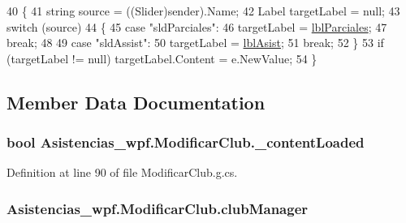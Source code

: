 \begin{DoxyCode}
40         \{
41             \textcolor{keywordtype}{string} source = ((Slider)sender).Name;
42             Label targetLabel = null;
43             \textcolor{keywordflow}{switch} (source)
44             \{
45                 \textcolor{keywordflow}{case} \textcolor{stringliteral}{"sldParciales"}:
46                     targetLabel = \hyperlink{class_asistencias__wpf_1_1_modificar_club_a898ac5359d41d715dbfb86b46a84a39f}{lblParciales};
47                     \textcolor{keywordflow}{break};
48 
49                 \textcolor{keywordflow}{case} \textcolor{stringliteral}{"sldAssist"}:
50                     targetLabel = \hyperlink{class_asistencias__wpf_1_1_modificar_club_ac5bdd9fd539f35d3f2e5fbd928913db5}{lblAsist};
51                     \textcolor{keywordflow}{break};
52             \}
53             \textcolor{keywordflow}{if} (targetLabel != null) targetLabel.Content = e.NewValue;
54         \}
\end{DoxyCode}


\subsection{Member Data Documentation}
\hypertarget{class_asistencias__wpf_1_1_modificar_club_a1a23f498d37b0f95f283e2b650e396ba}{
\subsubsection[{\-\_\-content\-Loaded}]{\setlength{\rightskip}{0pt plus 5cm}bool Asistencias\-\_\-wpf.\-Modificar\-Club.\-\_\-content\-Loaded\hspace{0.3cm}{\ttfamily [private]}}}\label{class_asistencias__wpf_1_1_modificar_club_a1a23f498d37b0f95f283e2b650e396ba}


Definition at line 90 of file Modificar\-Club.\-g.\-cs.

\hypertarget{class_asistencias__wpf_1_1_modificar_club_a23406da77e2686429033309d5f2432c7}{
\subsubsection[{club\-Manager}]{ Asistencias\-\_\-wpf.\-Modificar\-Club.\-club\-Manager\hspace{0.3cm}{\ttfamily [private]}}}\label{class_asistencias__wpf_1_1_modificar_club_a23406da77e2686429033309d5f2432c7}


